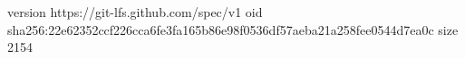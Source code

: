 version https://git-lfs.github.com/spec/v1
oid sha256:22e62352ccf226cca6fe3fa165b86e98f0536df57aeba21a258fee0544d7ea0c
size 2154
